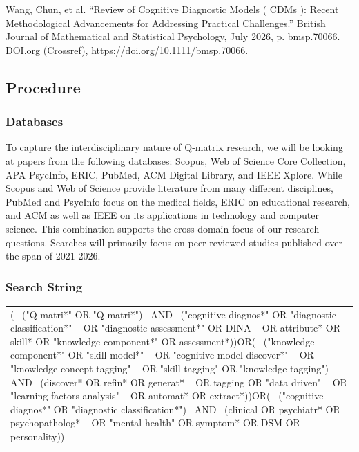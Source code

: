 \documentclass[sigconf]{acmart}
\begin{document}
Wang, Chun, et al. “Review of Cognitive Diagnostic Models ( CDMs ): Recent Methodological Advancements for Addressing Practical Challenges.” British Journal of Mathematical and Statistical Psychology, July 2026, p. bmsp.70066. DOI.org (Crossref), https://doi.org/10.1111/bmsp.70066.

 

\subsection{\textbf{Procedure}}

\subsubsection{\textbf{Databases}}

To capture the interdisciplinary nature of Q-matrix research, we will be looking at papers from the following databases: Scopus, Web of Science Core Collection, APA PsycInfo, ERIC, PubMed, ACM Digital Library, and IEEE Xplore. While Scopus and Web of Science provide literature from many different disciplines, PubMed and PsycInfo focus on the medical fields, ERIC on educational research, and ACM as well as IEEE on its applications in technology and computer science. This combination supports the cross-domain focus of our research questions. Searches will primarily focus on peer-reviewed studies published over the span of 2021-2026.

\subsubsection{\textbf{Search String}}

\begin{table}
\centering

\begin{tabular}{l}
(  ("Q-matri*" OR "Q matri*")  AND  ("cognitive diagnos*" OR "diagnostic classification*"   OR "diagnostic assessment*" OR DINA   OR attribute* OR skill* OR "knowledge component*" OR assessment*))OR(  ("knowledge component*" OR "skill model*"   OR "cognitive model discover*"   OR "knowledge concept tagging"   OR "skill tagging" OR "knowledge tagging")  AND  (discover* OR refin* OR generat*   OR tagging OR "data driven"   OR "learning factors analysis"   OR automat* OR extract*))OR(  ("cognitive diagnos*" OR "diagnostic classification*")  AND  (clinical OR psychiatr* OR psychopatholog*   OR "mental health" OR symptom* OR DSM OR personality)) \\

\end{tabular}

\end{table}
\end{document}

